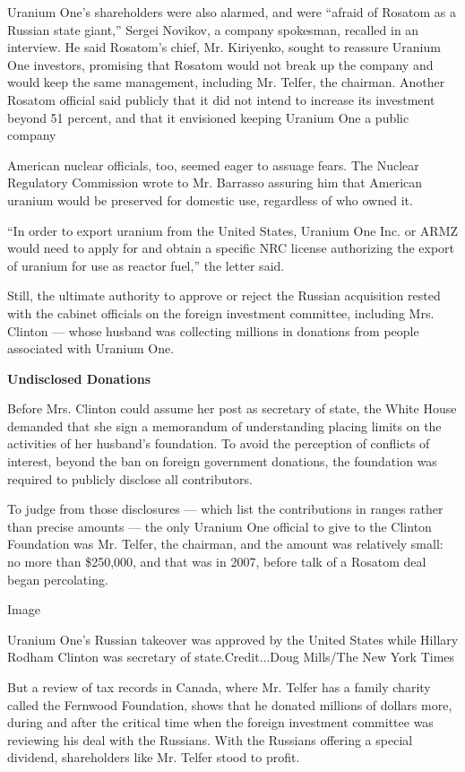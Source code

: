 Uranium One's shareholders were also alarmed, and were ``afraid of
Rosatom as a Russian state giant,'' Sergei Novikov, a company spokesman,
recalled in an interview. He said Rosatom's chief, Mr. Kiriyenko, sought
to reassure Uranium One investors, promising that Rosatom would not
break up the company and would keep the same management, including Mr.
Telfer, the chairman. Another Rosatom official said publicly that it did
not intend to increase its investment beyond 51 percent, and that it
envisioned keeping Uranium One a public company

American nuclear officials, too, seemed eager to assuage fears. The
Nuclear Regulatory Commission wrote to Mr. Barrasso assuring him that
American uranium would be preserved for domestic use, regardless of who
owned it.

``In order to export uranium from the United States, Uranium One Inc. or
ARMZ would need to apply for and obtain a specific NRC license
authorizing the export of uranium for use as reactor fuel,'' the letter
said.

Still, the ultimate authority to approve or reject the Russian
acquisition rested with the cabinet officials on the foreign investment
committee, including Mrs. Clinton --- whose husband was collecting
millions in donations from people associated with Uranium One.

\textbf{Undisclosed Donations}

Before Mrs. Clinton could assume her post as secretary of state, the
White House demanded that she sign a memorandum of understanding placing
limits on the activities of her husband's foundation. To avoid the
perception of conflicts of interest, beyond the ban on foreign
government donations, the foundation was required to publicly disclose
all contributors.

To judge from those disclosures --- which list the contributions in
ranges rather than precise amounts --- the only Uranium One official to
give to the Clinton Foundation was Mr. Telfer, the chairman, and the
amount was relatively small: no more than \$250,000, and that was in
2007, before talk of a Rosatom deal began percolating.

Image

Uranium One's Russian takeover was approved by the United States while
Hillary Rodham Clinton was secretary of state.Credit...Doug Mills/The
New York Times

But a review of tax records in Canada, where Mr. Telfer has a family
charity called the Fernwood Foundation, shows that he donated millions
of dollars more, during and after the critical time when the foreign
investment committee was reviewing his deal with the Russians. With the
Russians offering a special dividend, shareholders like Mr. Telfer stood
to profit.

